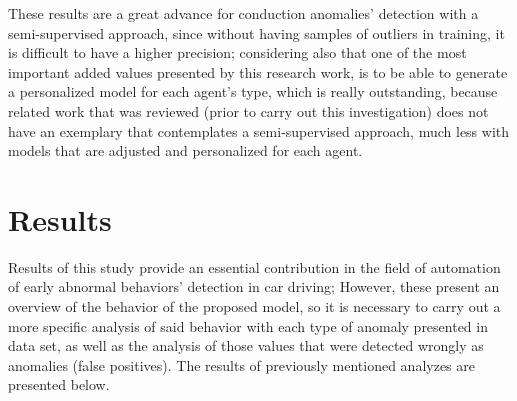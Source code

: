 These results are a great advance for conduction anomalies' detection with a semi-supervised approach, since without having samples of outliers in training, it is difficult to have a higher precision; considering also that one of the most important added values presented by this research work, is to be able to generate a personalized model for each agent's type, which is really outstanding, because related work that was reviewed (prior to carry out this investigation) does not have an exemplary that contemplates a semi-supervised approach, much less with models that are adjusted and personalized for each agent.


\section{Results}

Results of this study provide an essential contribution in the field of automation of early abnormal behaviors' detection in car driving; However, these present an overview of the behavior of the proposed model, so it is necessary to carry out a more specific analysis of said behavior with each type of anomaly presented in data set, as well as the analysis of those values that were detected wrongly as anomalies (false positives). The results of previously mentioned analyzes are presented below.

